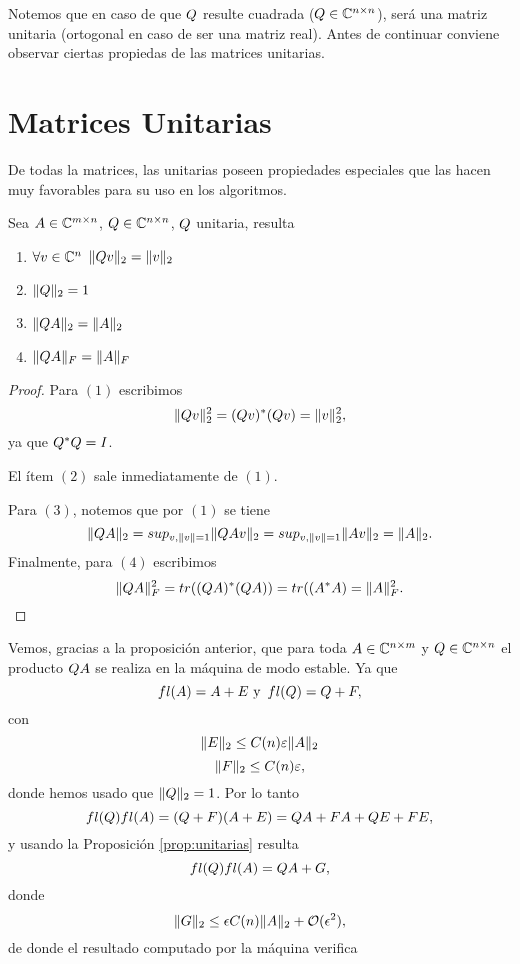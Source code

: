 \begin{tcolorbox}
Notemos que en caso de que $\Qb$ resulte cuadrada ($\Qb\in \C^{n\times n}$), será una matriz unitaria (ortogonal en caso de ser una matriz real). Antes de continuar conviene observar ciertas propiedas de las matrices unitarias.

\section{Matrices Unitarias}
De todas la matrices, las unitarias poseen propiedades especiales que las hacen muy favorables para su uso en los algoritmos.
\tcc
\begin{prop}
 \label{prop:unitarias}
 Sea $\Ab\in \C^{m\times n}$, $\Qb\in \Cnn$, $\Qb$ unitaria, resulta
 \begin{enumerate}
  \item $\forall \vb\in \Cn$
  $\|\Qb\vb\|_{2}=\|\vb\|_2$
  \item $\|\Qb\|_{2}=1$
  \item $\|\Qb\Ab\|_2=\|\Ab\|_2$
  \item $\|\Qb\Ab\|_F=\|\Ab\|_F$

 \end{enumerate}
\end{prop}
\etcc
\begin{proof} Para $(1)$ escribimos
 $$
 \|\Qb\vb\|_{2}^2=(\Qb\vb)^*(\Qb\vb)=\|\vb\|_2^2,
 $$
 ya que $\Qb^*\Qb=\Ib$.

 El ítem $(2)$ sale inmediatamente de $(1)$.

 Para $(3)$, notemos que por $(1)$ se tiene
 $$\|\Qb\Ab \|_{2}=sup_{\vb, \|\vb\|=1}
 \|\Qb\Ab \vb\|_{2}=sup_{\vb, \|\vb\|=1}\|\Ab\vb\|_2=\|\Ab\|_2.
 $$
 Finalmente, para $(4)$ escribimos
 $$
 \|\Qb\Ab\|_F^2=tr((\Qb\Ab)^*(\Qb\Ab))=tr((\Ab^*\Ab)=\|\Ab\|_F^2.
 $$

\end{proof}

Vemos, gracias a la proposición anterior, que para toda $\Ab\in \C^{n\times m}$ y $\Qb\in \Cnn$ el producto $\Qb\Ab$ se realiza en la máquina de modo estable. Ya que
$$
fl(\Ab)=\Ab + \Eb \,\, \mbox{y }\,  fl(\Qb)=\Qb + \Fb,
$$
con
$$
\|\Eb\|_2\le C(n)\varepsilon
\|\Ab\|_2
$$
$$
\|\Fb\|_2\le C(n)\varepsilon,$$
donde hemos usado que $\|\Qb\|_2=1$.
Por lo tanto
$$
fl(\Qb)fl(\Ab)=(\Qb + \Fb)(\Ab + \Eb)=\Qb\Ab+\Fb\Ab+\Qb\Eb+\Fb\Eb,
$$
y usando la Proposición \ref{prop:unitarias} resulta
$$
fl(\Qb)fl(\Ab)=\Qb\Ab+\Gb,
$$
donde
$$
\|\Gb\|_2\le \epsilon C(n)\|\Ab\|_2+\mathcal{O}(\epsilon^2),
$$
de donde el resultado computado por la máquina verifica


\end{tcolorbox}

